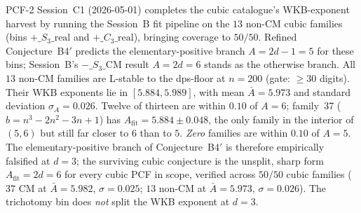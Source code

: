 
PCF-2 Session~C1 (2026-05-01) completes the cubic catalogue's
WKB-exponent harvest by running the Session~B fit pipeline on the $13$
non-CM cubic families (bins $+\_S_3\_\mathrm{real}$ and
$+\_C_3\_\mathrm{real}$), bringing coverage to $50/50$. Refined
Conjecture~B4$'$ predicts the elementary-positive branch $A = 2d - 1
= 5$ for these bins; Session~B's $-\_S_3\_\mathrm{CM}$ result $A = 2d
= 6$ stands as the otherwise branch. All $13$ non-CM families are
L-stable to the dps-floor at $n = 200$ (gate: $\ge 30$ digits). Their
WKB exponents lie in $[5.884, 5.989]$, with mean $\bar{A} = 5.973$ and
standard deviation $\sigma_A = 0.026$. Twelve of thirteen are within
$0.10$ of $A = 6$; family~37 ($b = n^3 - 2n^2 - 3n + 1$) has
$A_{\mathrm{fit}} = 5.884 \pm 0.048$, the only family in the interior
of $(5,6)$ but still far closer to $6$ than to $5$. \emph{Zero}
families are within $0.10$ of $A = 5$. The elementary-positive branch
of Conjecture~B4$'$ is therefore empirically falsified at $d = 3$;
the surviving cubic conjecture is the unsplit, sharp form
$A_{\mathrm{fit}} = 2d = 6$ for every cubic PCF in scope, verified
across $50/50$ cubic families ($37$ CM at $\bar{A} = 5.982$,
$\sigma = 0.025$; $13$ non-CM at $\bar{A} = 5.973$,
$\sigma = 0.026$). The trichotomy bin does \emph{not} split the WKB
exponent at $d = 3$.
